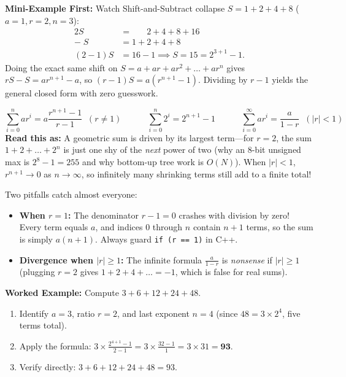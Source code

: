 \documentclass[11pt,a4paper]{article}
\theoremstyle{definition}
\newcommand{\examplebeat}{\textbf{\color{primaryblue}Mini-Example First:} }
\begin{document}
\examplebeat Watch Shift-and-Subtract collapse $S = 1 + 2 + 4 + 8$ ($a = 1, r = 2, n = 3$):
\[
\begin{aligned}
    2S &= \phantom{1 + {}} 2 + 4 + 8 + 16 \\
    -\; S &= 1 + 2 + 4 + 8 \\ \hline
    (2 - 1)S &= 16 - 1 \implies S = 15 = 2^{3 + 1} - 1.
\end{aligned}
\]
Doing the exact same shift on $S = a + ar + ar^2 + \dots + ar^n$ gives $rS - S = ar^{n+1} - a$, so $(r - 1)S = a(r^{n+1} - 1)$. Dividing by $r - 1$ yields the general closed form with zero guesswork.

\begin{formulabox}
\[
    \sum_{i=0}^{n} a r^i = a\frac{r^{n+1} - 1}{r - 1} \;\; (r \neq 1)
    \qquad\quad
    \sum_{i=0}^{n} 2^i = 2^{n+1} - 1
    \qquad\quad
    \sum_{i=0}^{\infty} a r^i = \frac{a}{1 - r} \;\; (|r| < 1)
\]
\textbf{Read this as:} A geometric sum is driven by its largest term---for $r = 2$, the sum $1 + 2 + \dots + 2^n$ is just one shy of the \emph{next} power of two (why an 8-bit unsigned max is $2^8 - 1 = 255$ and why bottom-up tree work is $O(N)$). When $|r| < 1$, $r^{n+1} \to 0$ as $n \to \infty$, so infinitely many shrinking terms still add to a finite total!
\end{formulabox}

\begin{watchoutbox}[Watch Out --- $r = 1$ Division by Zero and Term Count]
Two pitfalls catch almost everyone:
\begin{itemize}
    \item \textbf{When $r = 1$:} The denominator $r - 1 = 0$ crashes with division by zero! Every term equals $a$, and indices $0$ through $n$ contain $n + 1$ terms, so the sum is simply $a(n + 1)$. Always guard \texttt{if (r == 1)} in C++.
    \item \textbf{Divergence when $|r| \ge 1$:} The infinite formula $\frac{a}{1 - r}$ is \emph{nonsense} if $|r| \ge 1$ (plugging $r = 2$ gives $1 + 2 + 4 + \dots = -1$, which is false for real sums).
\end{itemize}
\end{watchoutbox}

\textbf{Worked Example:} Compute $3 + 6 + 12 + 24 + 48$.
\begin{enumerate}
    \item Identify $a = 3$, ratio $r = 2$, and last exponent $n = 4$ (since $48 = 3 \times 2^4$, five terms total).
    \item Apply the formula: $3 \times \frac{2^{4+1} - 1}{2 - 1} = 3 \times \frac{32 - 1}{1} = 3 \times 31 = \mathbf{93}$.
    \item Verify directly: $3 + 6 + 12 + 24 + 48 = 93$.
\end{enumerate}
\end{document}
